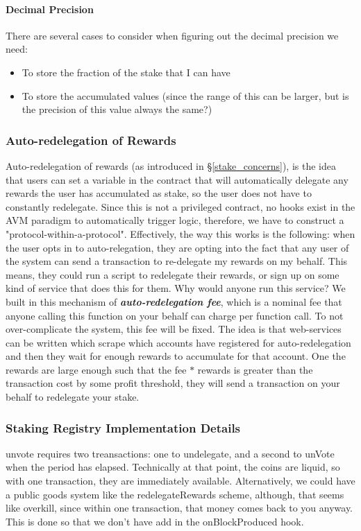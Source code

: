 \paragraph{Decimal Precision}

There are several cases to consider when figuring out the decimal precision we need:
\begin{itemize}[label=--,nosep]
    \item To store the fraction of the stake that I can have
    \item To store the accumulated values (since the range of this can be larger, but is the precision of this value always the same?) 
\end{itemize}

\subsubsection{Auto-redelegation of Rewards} 
Auto-redelegation of rewards (as introduced in \S\ref{stake_concerns}), is the idea that users can set a variable in the contract that will automatically delegate any rewards the user has accumulated as stake, so the user does not have to constantly redelegate. Since this is not a privileged contract, no hooks exist in the AVM paradigm to automatically trigger logic, therefore, we have to construct a "protocol-within-a-protocol". Effectively, the way this works is the following: when the user opts in to auto-relegation, they are opting into the fact that any user of the system can send a transaction to re-delegate my rewards on my behalf. This means, they could run a script to redelegate their rewards, or sign up on some kind of service that does this for them. Why would anyone run this service? We built in this mechanism of \textbf{\textit{auto-redelegation fee}}, which is a nominal fee that anyone calling this function on your behalf can charge per function call. To not over-complicate the system, this fee will be fixed. The idea is that web-services can be written which scrape which accounts have registered for auto-redelegation and then they wait for enough rewards to accumulate for that account. One the rewards are large enough such that the fee $*$ rewards is greater than the transaction cost by some profit threshold, they will send a transaction on your behalf to redelegate your stake.  

\subsubsection{Staking Registry Implementation Details}
unvote requires two treansactions: one to undelegate, and a second to unVote when the period has elapsed. Technically at that point, the coins are liquid, so with one transaction, they are immediately available. Alternatively, we could have a public goods system like the redelegateRewards scheme, although, that seems like overkill, since within one transaction, that money comes back to you anyway. This is done so that we don't have add in the onBlockProduced hook. 

